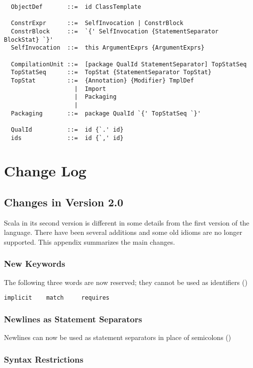 \begin{lstlisting}
  ObjectDef       ::=  id ClassTemplate

  ConstrExpr      ::=  SelfInvocation | ConstrBlock
  ConstrBlock     ::=  `{' SelfInvocation {StatementSeparator BlockStat} `}'
  SelfInvocation  ::=  this ArgumentExprs {ArgumentExprs}

  CompilationUnit ::=  [package QualId StatementSeparator] TopStatSeq
  TopStatSeq      ::=  TopStat {StatementSeparator TopStat}
  TopStat         ::=  {Annotation} {Modifier} TmplDef
                    |  Import
                    |  Packaging
                    |
  Packaging       ::=  package QualId `{' TopStatSeq `}'

  QualId          ::=  id {`.' id}
  ids             ::=  id {`,' id}
\end{lstlisting}

\chapter{Change Log}

\section{Changes in Version 2.0}

Scala in its second version is different in some details from the
first version of the language. There have been several additions and
some old idioms are no longer supported. This appendix summarizes
the main changes.

\subsection*{New Keywords}

The following three words are now reserved; they cannot be used as
identifiers ()
\begin{lstlisting}
implicit    match     requires
\end{lstlisting}

\subsection*{Newlines as Statement Separators}

Newlines can now be used as statement separators in place of
semicolons ()

\subsection*{Syntax Restrictions}

